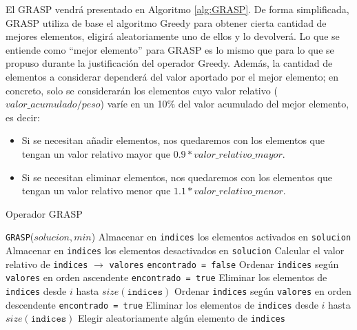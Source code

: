 El GRASP vendrá presentado en Algoritmo \ref{alg:GRASP}. 
De forma simplificada, GRASP utiliza de base el algoritmo Greedy para obtener cierta cantidad de mejores elementos, eligirá aleatoriamente uno de ellos y lo devolverá. 
Lo que se entiende como ``mejor elemento'' para GRASP es lo mismo que para lo que se propuso durante la justificación del operador Greedy. 
Además, la cantidad de elementos a considerar dependerá del valor aportado por el mejor elemento; en concreto, solo se considerarán los elementos cuyo valor relativo ($valor\_acumulado/peso$) varíe en un 10\% del valor acumulado del mejor elemento, es decir:
\begin{itemize}
	\item Si se necesitan añadir elementos, nos quedaremos con los elementos que tengan un valor relativo mayor que $0.9*valor\_relativo\_mayor$.
	\item Si se necesitan eliminar elementos, nos quedaremos con los elementos que tengan un valor relativo menor que $1.1*valor\_relativo\_menor$.
\end{itemize}

\begin{algorithm}
\caption{Operador GRASP}\label{alg:GRASP}
\begin{algorithmic}[1]
\Procedure \texttt{GRASP}($solucion, min$)
	\State Almacenar en \texttt{indices} los elementos activados en \texttt{solucion}
\Else
	\State Almacenar en \texttt{indices} los elementos desactivados en \texttt{solucion}
\EndIf
\State Calcular el valor relativo de \texttt{indices} $\xrightarrow{}{}$ \texttt{valores}
\State \texttt{encontrado = false}
	\State Ordenar \texttt{indices} según \texttt{valores} en orden ascendente
			\State \texttt{encontrado = true}
			\State Eliminar los elementos de \texttt{indices} desde $i$ hasta $size(\texttt{indices})$
		\EndIf
	\EndFor
\Else
	\State Ordenar \texttt{indices} según \texttt{valores} en orden descendente
			\State \texttt{encontrado = true}
			\State Eliminar los elementos de \texttt{indices} desde $i$ hasta $size(\texttt{indices})$
		\EndIf
	\EndFor
\EndIf
\State Elegir aleatoriamente algún elemento de \texttt{indices}
\EndProcedure
\end{algorithmic}
\end{algorithm}

